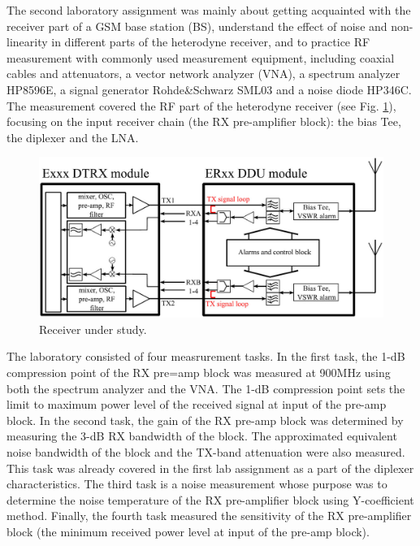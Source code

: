 \documentclass[a4paper, 12pt]{article}
\begin{document}
The second laboratory assignment was mainly about getting acquainted with the receiver part of a GSM base station (BS), understand the effect of noise and non-linearity in different parts of the heterodyne receiver, and to practice RF measurement with commonly used measurement equipment, including coaxial cables and attenuators, a vector network analyzer (VNA), a spectrum analyzer HP8596E, a signal generator Rohde\&Schwarz SML03 and a noise diode HP346C. The measurement covered the RF part of the heterodyne receiver (see Fig. \ref{f:bs}), focusing on the input receiver chain (the RX pre-amplifier block): the bias Tee, the diplexer and the LNA.
\\
\begin{figure}[h!]
	\begin{center}
	\includegraphics[width=\textwidth]{img/bs.jpg}
	\caption{Receiver under study.}
	\label{f:bs}
	\end{center}
	\vspace*{-12pt}
\end{figure}

The laboratory consisted of four measrurement tasks. In the first task, the 1-dB compression point of the RX pre=amp block was measured at 900MHz using both the spectrum analyzer and the VNA. The 1-dB compression point sets the limit to maximum power level of the received signal at input of the pre-amp block. In the second task, the gain of the RX pre-amp block was determined by measuring the 3-dB RX bandwidth of the block. The approximated equivalent noise bandwidth of the block and the TX-band attenuation were also measured. This task was already covered in the first lab assignment as a part of the diplexer characteristics. The third task is a noise measurement whose purpose was to determine the noise temperature of the RX pre-amplifier block using Y-coefficient method. Finally, the fourth task measured the sensitivity of the RX pre-amplifier block (the minimum received power level at input of the pre-amp block).
\\
\end{document}
